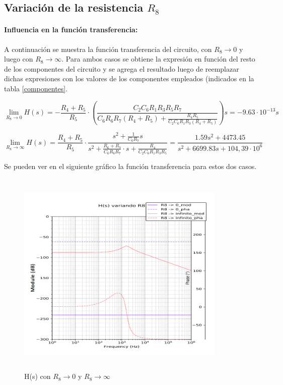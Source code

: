\subsection{Variaci\'on de la resistencia $R_8$}

\paragraph*{Influencia en la funci\'on transferencia:} A continuaci\'on se muestra la funci\'on transferencia del circuito, con $R_8\to 0$ y luego con $R_8\to \infty$. Para ambos casos se obtiene la expresi\'on en funci\'on del resto de los componentes del circuito y se agrega el resultado luego de reemplazar dichas expresiones con los valores de los componentes empleados (indicados en la tabla \ref{componentes}.

\begin{equation}
\lim_{R_8\to 0} H(s) = - \frac{R_4 + R_5}{R_5} \cdot 
\left(\frac{C_2 C_6 R_1 R_3 R_5 R_7}{C_6 R_6 R_7(R_4 + R_5)+\frac{R_4 R_5}{C_2 C_6 R_1 R_3 (R_4+R_5)}}\right)s = - 9.63 \cdot 10^{-13} s
\end{equation}

\begin{equation}
\lim_{R_8\to \infty} H(s) = \frac{R_4 + R_5}{R_5} \cdot \frac{s^2 + \frac{1}{C_6 R_7}s}{s^2 + \frac{R_6 + R_7}{C_6 R_6 R_7}\cdot s + \frac{R_4}{C_2 C_6 R_1 R_3 R_5}} = \frac{1.59 s^{2} + 4473.45}{s^{2} + 6699.83 s + 104,39 \cdot 10^6}
\end{equation}

Se pueden ver en el siguiente gr\'afico la funci\'on transferencia para estos dos casos.

\begin{figure}[H] %
	\centering
	\includegraphics[width=10cm,height=10cm,keepaspectratio]{../EJ1/00GRAFICOS/r88.png}
	\caption{H(s) con $R_8 \to 0$ y $R_8 \to \infty$}
	\label{r8}
\end{figure}

